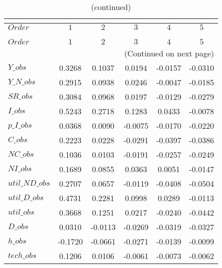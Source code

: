  
\begin{center}
\begin{longtable}{lccccc} 
\caption{COEFFICIENTS OF AUTOCORRELATION}\\
 \label{Table:th_autocorr_matrix}\\
\toprule 
$Order          $	 & 	 $          1$	 & 	 $          2$	 & 	 $          3$	 & 	 $          4$	 & 	 $          5$\\
\midrule \endfirsthead 
\caption{(continued)}\\
 \toprule \\ 
$Order          $	 & 	 $          1$	 & 	 $          2$	 & 	 $          3$	 & 	 $          4$	 & 	 $          5$\\
\midrule \endhead 
\midrule \multicolumn{6}{r}{(Continued on next page)} \\ \bottomrule \endfoot 
\bottomrule \endlastfoot 
$Y\_obs         $	 & 	     0.3268	 & 	     0.1037	 & 	     0.0194	 & 	    -0.0157	 & 	    -0.0310 \\ 
$Y\_N\_obs      $	 & 	     0.2915	 & 	     0.0938	 & 	     0.0246	 & 	    -0.0047	 & 	    -0.0185 \\ 
$SR\_obs        $	 & 	     0.3084	 & 	     0.0968	 & 	     0.0197	 & 	    -0.0129	 & 	    -0.0279 \\ 
$I\_obs         $	 & 	     0.5243	 & 	     0.2718	 & 	     0.1283	 & 	     0.0433	 & 	    -0.0078 \\ 
$p\_I\_obs      $	 & 	     0.0368	 & 	     0.0090	 & 	    -0.0075	 & 	    -0.0170	 & 	    -0.0220 \\ 
$C\_obs         $	 & 	     0.2223	 & 	     0.0228	 & 	    -0.0291	 & 	    -0.0397	 & 	    -0.0386 \\ 
$NC\_obs        $	 & 	     0.1036	 & 	     0.0103	 & 	    -0.0191	 & 	    -0.0257	 & 	    -0.0249 \\ 
$NI\_obs        $	 & 	     0.1689	 & 	     0.0855	 & 	     0.0363	 & 	     0.0051	 & 	    -0.0147 \\ 
$util\_ND\_obs  $	 & 	     0.2707	 & 	     0.0657	 & 	    -0.0119	 & 	    -0.0408	 & 	    -0.0504 \\ 
$util\_D\_obs   $	 & 	     0.4731	 & 	     0.2281	 & 	     0.0998	 & 	     0.0289	 & 	    -0.0113 \\ 
$util\_obs      $	 & 	     0.3668	 & 	     0.1251	 & 	     0.0217	 & 	    -0.0240	 & 	    -0.0442 \\ 
$D\_obs         $	 & 	     0.0310	 & 	    -0.0113	 & 	    -0.0269	 & 	    -0.0319	 & 	    -0.0327 \\ 
$h\_obs         $	 & 	    -0.1720	 & 	    -0.0661	 & 	    -0.0271	 & 	    -0.0139	 & 	    -0.0099 \\ 
$tech\_obs      $	 & 	     0.1206	 & 	     0.0106	 & 	    -0.0061	 & 	    -0.0073	 & 	    -0.0062 \\ 
\end{longtable}
 \end{center}
